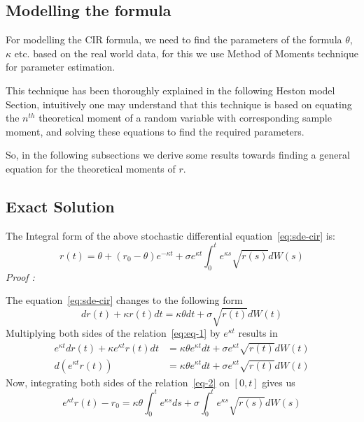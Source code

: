 \subsection{Modelling the formula}

For modelling the CIR formula, we need to find the
parameters of the formula $\theta$, $\kappa$ etc.
based on the real world data, for this we use Method of Moments
technique for parameter estimation.

This technique has been thoroughly explained in the following
Heston model Section, intuitively one may understand that this
technique is based on equating the $n^{th}$ theoretical moment of a
random variable with corresponding sample moment, and solving
these equations to find the required parameters.

So, in the following subsections we derive some results towards finding a
general equation for the theoretical moments of $r$.



\subsection{Exact Solution}
The Integral form of the above stochastic differential
equation~\ref{eq:sde-cir} is:
\begin{equation}
	r(t) = \theta + (r_0 - \theta)e^{-\kappa t} + \sigma e^{\kappa t}
	\int_{0}^{t}e^{\kappa s}\sqrt{r(s)}dW(s)
	\label{eq:closed-cir}
\end{equation}
\textit{Proof :}

The equation~\ref{eq:sde-cir} changes to the following form
\begin{equation}
	dr(t)+\kappa r(t)dt=\kappa \theta dt+\sigma \sqrt{r(t)}dW(t)
	\label{eq:eq-1}
\end{equation}
Multiplying both sides of the relation~\ref{eq:eq-1} by
$e^{\kappa t}$ results in
\begin{align}
	e^{\kappa t} d r(t)+\kappa e^{\kappa t} r(t) d t &=\kappa
		\theta e^{\kappa t} d t+\sigma e^{\kappa t} \sqrt{r(t)} d W(t) \\
	d\left(e^{\kappa t} r(t)\right) &=\kappa \theta e^{\kappa t}
		d t+\sigma e^{\kappa t} \sqrt{r(t)} d W(t)
		\label{eq-2}
\end{align}
Now, integrating both sides of the relation~\ref{eq-2} on $[0, t]$ gives us
\begin{equation}
	e^{\kappa t} r(t)-r_{0}=\kappa \theta \int_{0}^{t} e^{\kappa s}
	d s+\sigma \int_{0}^{t} e^{\kappa s} \sqrt{r(s)} d W(s)
	\label{eq:eq-3}
\end{equation}

